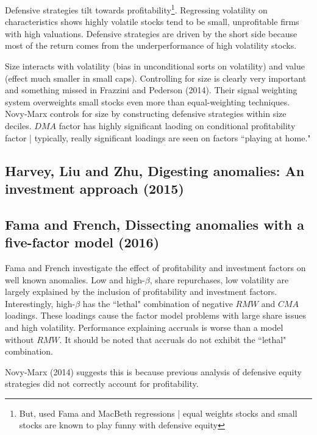 Defensive strategies tilt towards profitability\footnote{But, used Fama and MacBeth
regressions | equal weights stocks and small stocks are known to play funny with defensive
equity}. Regressing volatility on characteristics shows highly volatile stocks tend to be
small, unprofitable firms with high valuations. Defensive strategies are driven by the
short side because most of the return comes from the underperformance of high volatility
stocks.

Size interacts with volatility (bias in unconditional sorts on volatility) and value
(effect much smaller in small caps). Controlling for size is clearly very important and
something missed in Frazzini and Pederson (2014). Their signal weighting system
overweights small stocks even more than equal-weighting techniques. Novy-Marx controls for
size by constructing defensive strategies within size deciles. $DMA$ factor has highly
significant laoding on conditional profitability factor | typically, really significant
loadings are seen on factors ``playing at home."

\subsection[Harvey, Liu and Zhu, 2015]{Harvey, Liu and Zhu, Digesting anomalies: An investment approach (2015)\cite{harvey2015digesting}}

\subsection[Fama and French, 2016]{Fama and French, Dissecting anomalies with a five-factor model (2016)\cite{fama2016dissecting}}

Fama and French investigate the effect of profitability and investment factors on well
known anomalies. Low and high-$\beta$, share repurchases, low volatility are largely
explained by the inclusion of profitability and investment factors. Interestingly,
high-$\beta$ has the ``lethal" combination of negative $RMW$ and $CMA$ loadings. These
loadings cause the factor model problems with large share issues and high volatility.
Performance explaining accruals is worse than a model without $RMW$. It should be noted
that accruals do not exhibit the ``lethal" combination.

Novy-Marx (2014)\cite{novy2014understanding} suggests this is because previous analysis of
defensive equity strategies did not correctly account for profitability.
